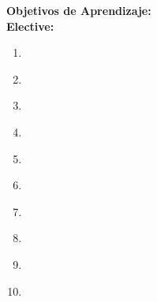 \noindent \textbf{Objetivos de Aprendizaje:}\\
\noindent \textbf{Elective:}
\begin{enumerate}
	\setcounter{enumi}{0}
	\item \ISAdvancedRepresentationandReasoningLOCompareAndMost\xspace[\ISAdvancedRepresentationandReasoningLOCompareAndMostLevel]\label{sec:BOK:ISAdvancedRepresentationandReasoningLOCompareAndMost}
	\item \ISAdvancedRepresentationandReasoningLOIdentifyTheNon\xspace[\ISAdvancedRepresentationandReasoningLOIdentifyTheNonLevel]\label{sec:BOK:ISAdvancedRepresentationandReasoningLOIdentifyTheNon}
	\item \ISAdvancedRepresentationandReasoningLOCompareAndBasic\xspace[\ISAdvancedRepresentationandReasoningLOCompareAndBasicLevel]\label{sec:BOK:ISAdvancedRepresentationandReasoningLOCompareAndBasic}
	\item \ISAdvancedRepresentationandReasoningLOCompareAndBasicQualitative\xspace[\ISAdvancedRepresentationandReasoningLOCompareAndBasicQualitativeLevel]\label{sec:BOK:ISAdvancedRepresentationandReasoningLOCompareAndBasicQualitative}
	\item \ISAdvancedRepresentationandReasoningLOApplySituation\xspace[\ISAdvancedRepresentationandReasoningLOApplySituationLevel]\label{sec:BOK:ISAdvancedRepresentationandReasoningLOApplySituation}
	\item \ISAdvancedRepresentationandReasoningLOExplainTheTemporal\xspace[\ISAdvancedRepresentationandReasoningLOExplainTheTemporalLevel]\label{sec:BOK:ISAdvancedRepresentationandReasoningLOExplainTheTemporal}
	\item \ISAdvancedRepresentationandReasoningLOExplainTheRule\xspace[\ISAdvancedRepresentationandReasoningLOExplainTheRuleLevel]\label{sec:BOK:ISAdvancedRepresentationandReasoningLOExplainTheRule}
	\item \ISAdvancedRepresentationandReasoningLODefineTheA\xspace[\ISAdvancedRepresentationandReasoningLODefineTheALevel]\label{sec:BOK:ISAdvancedRepresentationandReasoningLODefineTheA}
	\item \ISAdvancedRepresentationandReasoningLODescribeThePlanning\xspace[\ISAdvancedRepresentationandReasoningLODescribeThePlanningLevel]\label{sec:BOK:ISAdvancedRepresentationandReasoningLODescribeThePlanning}
	\item \ISAdvancedRepresentationandReasoningLOExplainTheMonotonic\xspace[\ISAdvancedRepresentationandReasoningLOExplainTheMonotonicLevel]\label{sec:BOK:ISAdvancedRepresentationandReasoningLOExplainTheMonotonic}
\end{enumerate}


